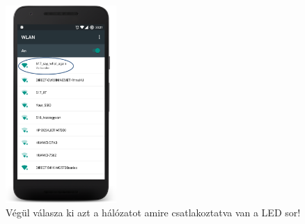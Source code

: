 \documentclass[../main.tex]{subfiles}
\begin{document}
            \begin{figure}[h!]
                \begin{floatrow}
                \end{floatrow}
            \end{figure}
            \begin{figure}[h!]
                \centering
                \includegraphics[width=4.2cm]{android_res/screen_pictures/wifi_err_03.png}
                \caption{Végül válasza ki azt a hálózatot amire csatlakoztatva van a LED sor!}
                \label{fig:wifi_err_03}
            \end{figure}
        
\end{document}
